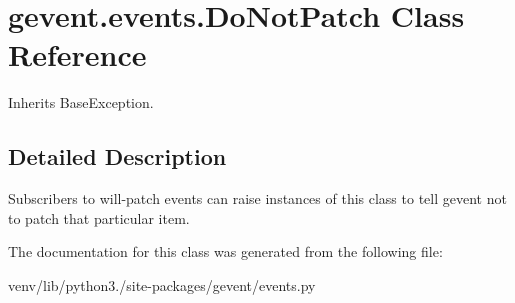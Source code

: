 \hypertarget{classgevent_1_1events_1_1_do_not_patch}{}\section{gevent.\+events.\+Do\+Not\+Patch Class Reference}
\label{classgevent_1_1events_1_1_do_not_patch}


Inherits Base\+Exception.



\subsection{Detailed Description}
\begin{DoxyVerb}Subscribers to will-patch events can raise instances
of this class to tell gevent not to patch that particular item.
\end{DoxyVerb}
 

The documentation for this class was generated from the following file\+:\begin{DoxyCompactItemize}
\item 
venv/lib/python3./site-\/packages/gevent/events.\+py\end{DoxyCompactItemize}
